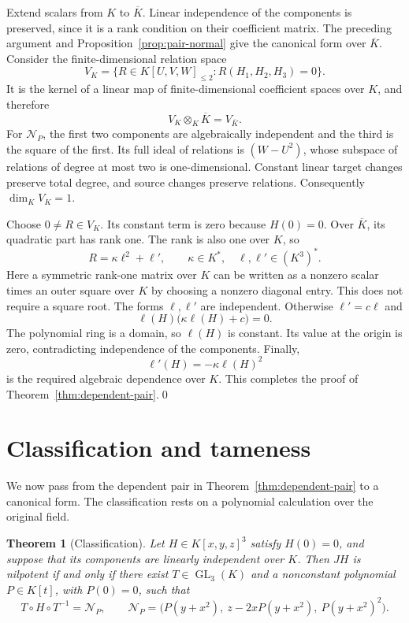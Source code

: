 \documentclass[11pt,reqno]{amsart}
\newtheorem{theorem}{Theorem}[section]
\theoremstyle{definition}
\theoremstyle{remark}
\numberwithin{equation}{section}
\DeclareMathOperator{\GL}{GL}
\newcommand{\Ncal}{\mathcal N}
\newcommand{\Kbar}{\overline K}
\begin{document}
Extend scalars from $K$ to $\Kbar$. Linear independence of the components is preserved, since it is a rank condition on their coefficient matrix. The preceding argument and Proposition~\ref{prop:pair-normal} give the canonical form over $\Kbar$. Consider the finite-dimensional relation space
\begin{equation}\label{eq:relation-space}
 V_K=\{R\in K[U,V,W]_{\leq2}:R(H_1,H_2,H_3)=0\}.
\end{equation}
It is the kernel of a linear map of finite-dimensional coefficient spaces over $K$, and therefore
\[
 V_K\otimes_K\Kbar=V_{\Kbar}.
\]
For $\Ncal_P$, the first two components are algebraically independent and the third is the square of the first. Its full ideal of relations is $(W-U^2)$, whose subspace of relations of degree at most two is one-dimensional. Constant linear target changes preserve total degree, and source changes preserve relations. Consequently $\dim_KV_K=1$.

Choose $0\neq R\in V_K$. Its constant term is zero because $H(0)=0$. Over $\Kbar$, its quadratic part has rank one. The rank is also one over $K$, so
\[
 R=\kappa\ell^2+\ell',\qquad \kappa\in K^*,\quad \ell,\ell'\in(K^3)^*.
\]
Here a symmetric rank-one matrix over $K$ can be written as a nonzero scalar times an outer square over $K$ by choosing a nonzero diagonal entry. This does not require a square root. The forms $\ell,\ell'$ are independent. Otherwise $\ell'=c\ell$ and
\[
 \ell(H)\bigl(\kappa\ell(H)+c\bigr)=0.
\]
The polynomial ring is a domain, so $\ell(H)$ is constant. Its value at the origin is zero, contradicting independence of the components. Finally,
\[
 \ell'(H)=-\kappa\ell(H)^2
\]
is the required algebraic dependence over $K$. This completes the proof of Theorem~\ref{thm:dependent-pair}.\qed

\section{Classification and tameness}\label{sec:classification}

We now pass from the dependent pair in Theorem~\ref{thm:dependent-pair} to a canonical form. The classification rests on a polynomial calculation over the original field.

\begin{theorem}[Classification]\label{thm:classification}
Let $H\in K[x,y,z]^3$ satisfy $H(0)=0$, and suppose that its components are linearly independent over $K$. Then $JH$ is nilpotent if and only if there exist $T\in\GL_3(K)$ and a nonconstant polynomial $P\in K[t]$, with $P(0)=0$, such that
\begin{equation}\label{eq:canonical}
 T\circ H\circ T^{-1}=\Ncal_P,
 \qquad
 \Ncal_P=\bigl(P(y+x^2),\ z-2xP(y+x^2),\ P(y+x^2)^2\bigr).
\end{equation}
\end{theorem}
\end{document}
